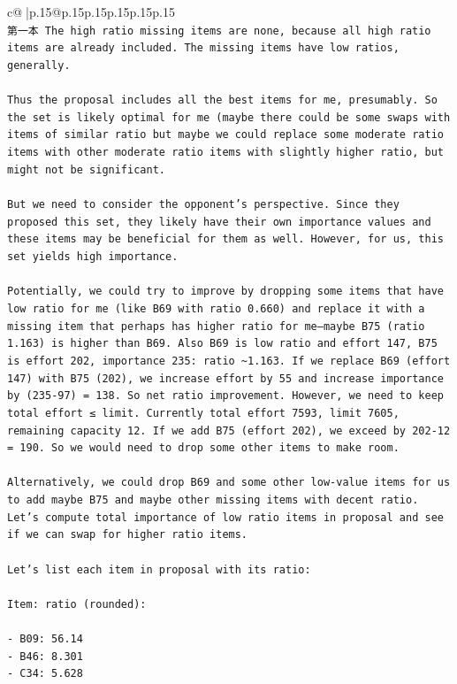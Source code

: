 \documentclass{article}
\begin{document}
{\begin{supertabular}{c@{$\;$}|p{.15\linewidth}@{}p{.15\linewidth}p{.15\linewidth}p{.15\linewidth}p{.15\linewidth}p{.15\linewidth}}
{{{\\ 
\texttt{第一本 The high ratio missing items are none, because all high ratio items are already included. The missing items have low ratios, generally.} \\
\\ 
\texttt{Thus the proposal includes all the best items for me, presumably. So the set is likely optimal for me (maybe there could be some swaps with items of similar ratio but maybe we could replace some moderate ratio items with other moderate ratio items with slightly higher ratio, but might not be significant.} \\
\\ 
\texttt{But we need to consider the opponent's perspective. Since they proposed this set, they likely have their own importance values and these items may be beneficial for them as well. However, for us, this set yields high importance.} \\
\\ 
\texttt{Potentially, we could try to improve by dropping some items that have low ratio for me (like B69 with ratio 0.660) and replace it with a missing item that perhaps has higher ratio for me—maybe B75 (ratio 1.163) is higher than B69. Also B69 is low ratio and effort 147, B75 is effort 202, importance 235: ratio \textasciitilde{}1.163. If we replace B69 (effort 147) with B75 (202), we increase effort by 55 and increase importance by (235{-}97) = 138. So net ratio improvement. However, we need to keep total effort ≤ limit. Currently total effort 7593, limit 7605, remaining capacity 12. If we add B75 (effort 202), we exceed by 202{-}12 = 190. So we would need to drop some other items to make room.} \\
\\ 
\texttt{Alternatively, we could drop B69 and some other low{-}value items for us to add maybe B75 and maybe other missing items with decent ratio. Let's compute total importance of low ratio items in proposal and see if we can swap for higher ratio items.} \\
\\ 
\texttt{Let's list each item in proposal with its ratio:} \\
\\ 
\texttt{Item: ratio (rounded):} \\
\\ 
\texttt{{-} B09: 56.14} \\
\texttt{{-} B46: 8.301} \\
\texttt{{-} C34: 5.628} \\
}}}
\end{supertabular}}
\end{document}

